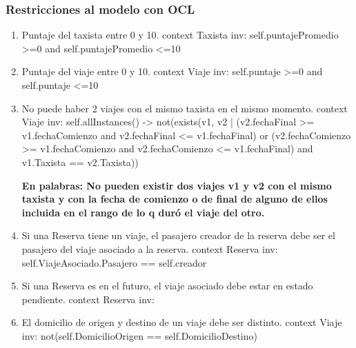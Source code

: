 \subsubsection{Restricciones al modelo con OCL}
\begin{enumerate}
	\item \begin{ocl}{Puntaje del taxista entre 0 y 10.}
		  context Taxista
		  inv: self.puntajePromedio >=0 and
		       self.puntajePromedio <=10
		\end{ocl}
	
	\item \begin{ocl}{Puntaje del viaje entre 0 y 10.}
		  context Viaje
		  inv: self.puntaje >=0 and
		       self.puntaje <=10
		\end{ocl}

	\item \begin{ocl}{No puede haber 2 viajes con el mismo taxista en el mismo momento.}
		  context Viaje
		  inv: self.allInstances() -> not(exists(v1, v2 | 
		     (v2.fechaFinal >= v1.fechaComienzo and v2.fechaFinal <= v1.fechaFinal) or 
		     (v2.fechaComienzo >= v1.fechaComienzo and v2.fechaComienzo <= v1.fechaFinal)
		     and v1.Taxista == v2.Taxista))
		\end{ocl}
		\textbf{En palabras: No pueden existir dos viajes v1 y v2 con el mismo taxista y con la fecha de comienzo o de final de alguno de ellos incluida en el rango de lo q duró el viaje del otro.}

	\item \begin{ocl}{Si una Reserva tiene un viaje, el pasajero creador de la reserva debe ser el pasajero del viaje asociado a la reserva.}
		  context Reserva
		  inv: self.ViajeAsociado.Pasajero == self.creador
		\end{ocl}

	\item \begin{ocl}{Si una Reserva es en el futuro, el viaje asociado debe estar en estado pendiente.}
		  context Reserva
		  inv: 
		\end{ocl}

	\item \begin{ocl}{El domicilio de origen y destino de un viaje debe ser distinto.}
		  context Viaje
		  inv: not(self.DomicilioOrigen == self.DomicilioDestino)
		\end{ocl}


\end{enumerate}

